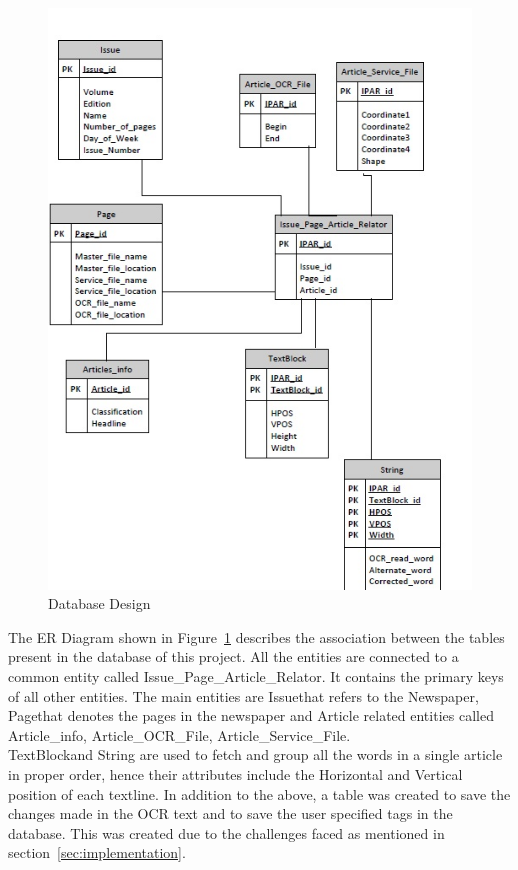 \documentclass[12pt]{article}
\begin{document}
\begin{figure}[ht!]
\centering
\includegraphics[width=\textwidth,height=0.75\textheight]{diag.jpg}
\caption{Database Design}
\label{fig:2}
\end{figure}

The ER Diagram shown in Figure~\ref{fig:2} describes the association between the tables present in the database of this project. All the entities are connected to a common entity called \textgravedbl Issue\_Page\_Article\_Relator\textasciidieresis. It contains the primary keys of all other entities. The main entities are \textgravedbl Issue\textasciidieresis that refers to the Newspaper, \textgravedbl Page\textasciidieresis that denotes the pages in the newspaper and Article related entities called \textgravedbl Article\_info\textasciidieresis, \textgravedbl Article\_OCR\_File\textasciidieresis, \textgravedbl Article\_Service\_File\textasciidieresis.\\ \textgravedbl TextBlock\textasciidieresis and \textgravedbl String \textasciidieresis are used to fetch and group all the words in a single article in proper order, hence their attributes include the Horizontal and Vertical position of each textline. In addition to the above, a table was created to save the changes made in the OCR text and to save the user specified tags in the database. This was created due to the challenges faced as mentioned in section~\ref{sec:implementation}.
\end{document}
